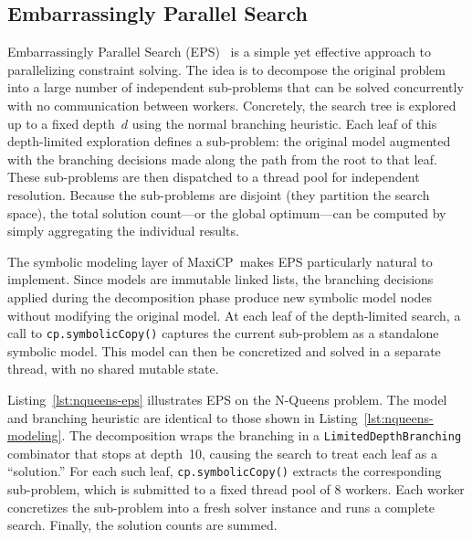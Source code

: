 \documentclass[11pt, a4paper]{scrartcl}
\newcommand{\maxicp}{\textsf{MaxiCP}}
\begin{document}
\subsection{Embarrassingly Parallel Search}
\label{sec:eps}

Embarrassingly Parallel Search (EPS)~\cite{regin2013embarrassingly,malapert2016embarrassingly} is a simple yet effective approach to parallelizing constraint solving.
The idea is to decompose the original problem into a large number of independent sub-problems that can be solved concurrently with no communication between workers.
Concretely, the search tree is explored up to a fixed depth~$d$ using the normal branching heuristic.
Each leaf of this depth-limited exploration defines a sub-problem: the original model augmented with the branching decisions made along the path from the root to that leaf.
These sub-problems are then dispatched to a thread pool for independent resolution.
Because the sub-problems are disjoint (they partition the search space), the total solution count---or the global optimum---can be computed by simply aggregating the individual results.

The symbolic modeling layer of \maxicp\ makes EPS particularly natural to implement.
Since models are immutable linked lists, the branching decisions applied during the decomposition phase produce new symbolic model nodes without modifying the original model.
At each leaf of the depth-limited search, a call to \texttt{cp.symbolicCopy()} captures the current sub-problem as a standalone symbolic model.
This model can then be concretized and solved in a separate thread, with no shared mutable state.

Listing~\ref{lst:nqueens-eps} illustrates EPS on the N-Queens problem.
The model and branching heuristic are identical to those shown in Listing~\ref{lst:nqueens-modeling}.
The decomposition wraps the branching in a \texttt{LimitedDepthBranching} combinator that stops at depth~10, causing the search to treat each leaf as a ``solution.''
For each such leaf, \texttt{cp.symbolicCopy()} extracts the corresponding sub-problem, which is submitted to a fixed thread pool of 8 workers.
Each worker concretizes the sub-problem into a fresh solver instance and runs a complete search.
Finally, the solution counts are summed.
\end{document}
